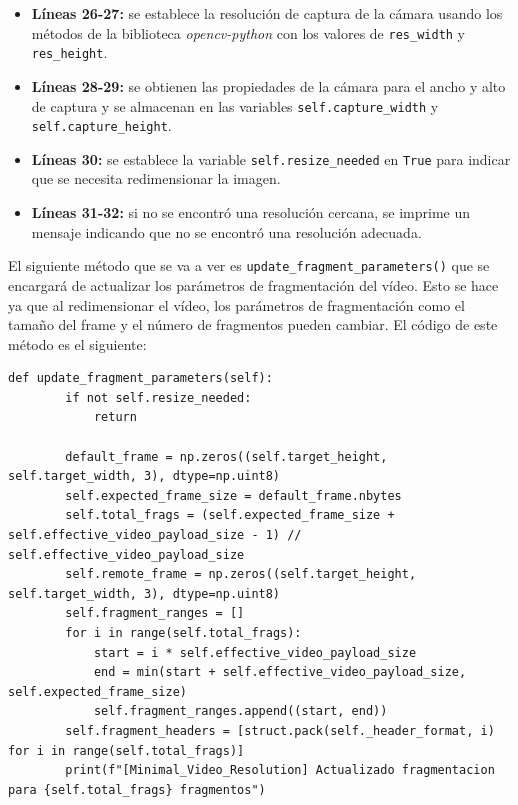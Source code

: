 \begin{itemize}
    \item \textbf{Líneas 26-27:} se establece la resolución de captura de la cámara usando los métodos de la biblioteca \textit{opencv-python} con los valores de \texttt{res\_width} y \texttt{res\_height}.
    \item \textbf{Líneas 28-29:} se obtienen las propiedades de la cámara para el ancho y alto de captura y se almacenan en las variables \texttt{self.capture\_width} y \texttt{self.capture\_height}.
    \item \textbf{Líneas 30:} se establece la variable \texttt{self.resize\_needed} en \texttt{True} para indicar que se necesita redimensionar la imagen.
    \item \textbf{Líneas 31-32:} si no se encontró una resolución cercana, se imprime un mensaje indicando que no se encontró una resolución adecuada.
\end{itemize}
\vspace{\baselineskip}

El siguiente método que se va a ver es \texttt{update\_fragment\_parameters()} que se encargará de actualizar los parámetros de fragmentación del vídeo. Esto se hace ya que al redimensionar el vídeo, los parámetros de fragmentación como el tamaño del frame y el número de fragmentos pueden cambiar. El código de este método es el siguiente:
\begin{lstlisting}[style=pythonstyle, caption={Método \texttt{update\_fragment\_parameters()} de \textit{Minimal\_Video\_Resolution}.}, label={lst:update_fragment_parameters_minimal_video_resolution}]
def update_fragment_parameters(self):
        if not self.resize_needed:
            return

        default_frame = np.zeros((self.target_height, self.target_width, 3), dtype=np.uint8)
        self.expected_frame_size = default_frame.nbytes
        self.total_frags = (self.expected_frame_size + self.effective_video_payload_size - 1) // self.effective_video_payload_size
        self.remote_frame = np.zeros((self.target_height, self.target_width, 3), dtype=np.uint8)
        self.fragment_ranges = []
        for i in range(self.total_frags):
            start = i * self.effective_video_payload_size
            end = min(start + self.effective_video_payload_size, self.expected_frame_size)
            self.fragment_ranges.append((start, end))
        self.fragment_headers = [struct.pack(self._header_format, i) for i in range(self.total_frags)]
        print(f"[Minimal_Video_Resolution] Actualizado fragmentacion para {self.total_frags} fragmentos")
\end{lstlisting}
\vspace{\baselineskip}

